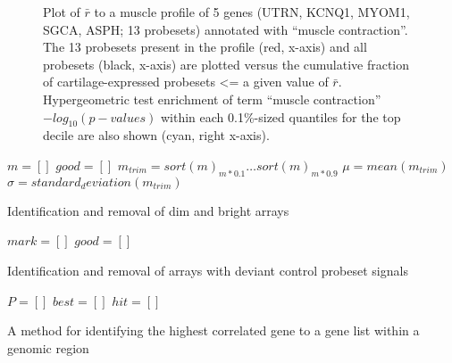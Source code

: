 \documentclass{bioinfo}
\begin{document}
\begin{figure}[!tpb]
\label{figure:muscle_cdf}
\centerline{}
\caption{Plot of $\bar{r}$ to a muscle profile of 5 genes (UTRN, KCNQ1, MYOM1,
SGCA, ASPH; 13 probesets) annotated with ``muscle contraction''.  The 13
probesets present in the profile (red, x-axis) and all probesets (black,
x-axis) are plotted versus the cumulative fraction of cartilage-expressed
probesets <= a given value of $\bar{r}$.  Hypergeometric test enrichment of
term ``muscle contraction'' $-log_10(p-values)$ within each 0.1\%-sized
quantiles for the top decile are also shown (cyan, right x-axis).}
\end{figure}



\begin{algorithm}\label{algorithm:mprime}
\SetLine
{}

$m = []$\;
$good = []$\;
$m_{trim} = sort(m)_{m*0.1} \dots sort(m)_{m*0.9}$\;
$\mu    = mean(m_{trim})$\;
$\sigma = standard_deviation(m_{trim})$\;
\;
\caption{Identification and removal of dim and bright arrays}
\end{algorithm}

\begin{algorithm}\label{algorithm:mprimeprime}
\SetLine
{}

$mark = []$\;
$good = []$\;
\;
\caption{Identification and removal of arrays with deviant control probeset signals}
\end{algorithm}

\begin{algorithm}\label{algorithm:linkage}
\SetLine
{}
$P = []$\;
$best = []$\;
$hit = []$\;
\;
\caption{A method for identifying the highest correlated gene to a gene list
within a genomic region}
\end{algorithm}
\end{document}
